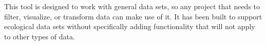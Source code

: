 \documentclass[12pt,letterpaper]{scrartcl}
\begin{document}
This tool is designed to work with general data sets, so any project that needs to filter, 
visualize, or transform data can make use of it.  It has been built to support ecological data sets 
without specifically adding functionality that will not apply to other types of data.

\setcounter{page}{1}

\pagebreak







\end{document}
